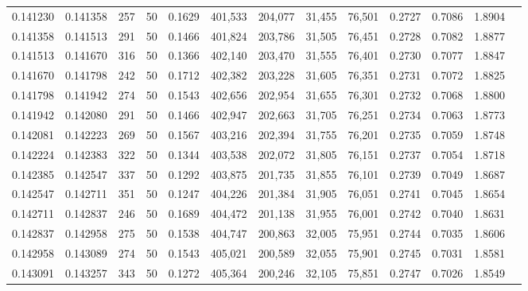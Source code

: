 \begin{tabular}{rrrrrrrrrrrrr}
0.141230 & 0.141358 &   257 &  50 &                                     0.1629 & 401,533 & 204,077 &  31,455 &  76,501 & 0.2727 & 0.7086 & 1.8904 \\
0.141358 & 0.141513 &   291 &  50 &                                     0.1466 & 401,824 & 203,786 &  31,505 &  76,451 & 0.2728 & 0.7082 & 1.8877 \\
0.141513 & 0.141670 &   316 &  50 &                                     0.1366 & 402,140 & 203,470 &  31,555 &  76,401 & 0.2730 & 0.7077 & 1.8847 \\
0.141670 & 0.141798 &   242 &  50 &                                     0.1712 & 402,382 & 203,228 &  31,605 &  76,351 & 0.2731 & 0.7072 & 1.8825 \\
0.141798 & 0.141942 &   274 &  50 &                                     0.1543 & 402,656 & 202,954 &  31,655 &  76,301 & 0.2732 & 0.7068 & 1.8800 \\
0.141942 & 0.142080 &   291 &  50 &                                     0.1466 & 402,947 & 202,663 &  31,705 &  76,251 & 0.2734 & 0.7063 & 1.8773 \\
0.142081 & 0.142223 &   269 &  50 &                                     0.1567 & 403,216 & 202,394 &  31,755 &  76,201 & 0.2735 & 0.7059 & 1.8748 \\
0.142224 & 0.142383 &   322 &  50 &                                     0.1344 & 403,538 & 202,072 &  31,805 &  76,151 & 0.2737 & 0.7054 & 1.8718 \\
0.142385 & 0.142547 &   337 &  50 &                                     0.1292 & 403,875 & 201,735 &  31,855 &  76,101 & 0.2739 & 0.7049 & 1.8687 \\
0.142547 & 0.142711 &   351 &  50 &                                     0.1247 & 404,226 & 201,384 &  31,905 &  76,051 & 0.2741 & 0.7045 & 1.8654 \\
0.142711 & 0.142837 &   246 &  50 &                                     0.1689 & 404,472 & 201,138 &  31,955 &  76,001 & 0.2742 & 0.7040 & 1.8631 \\
0.142837 & 0.142958 &   275 &  50 &                                     0.1538 & 404,747 & 200,863 &  32,005 &  75,951 & 0.2744 & 0.7035 & 1.8606 \\
0.142958 & 0.143089 &   274 &  50 &                                     0.1543 & 405,021 & 200,589 &  32,055 &  75,901 & 0.2745 & 0.7031 & 1.8581 \\
0.143091 & 0.143257 &   343 &  50 &                                     0.1272 & 405,364 & 200,246 &  32,105 &  75,851 & 0.2747 & 0.7026 & 1.8549 \\

\end{tabular}
